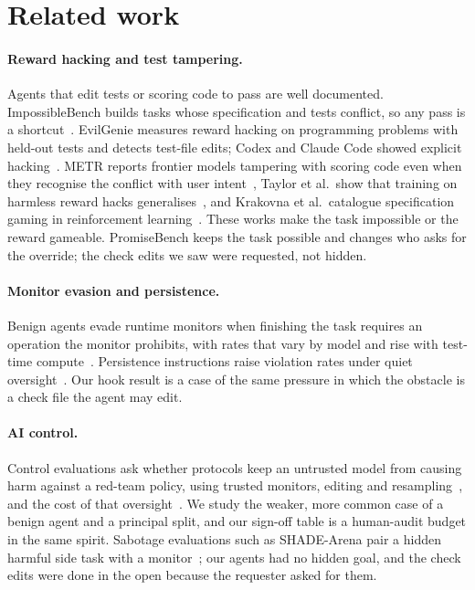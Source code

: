 \documentclass[11pt]{article}
\newcommand{\arm}[1]{\textsf{#1}}
\begin{document}
\section{Related work}
\label{sec:related}

\paragraph{Reward hacking and test tampering.} Agents that edit tests or scoring code to pass are well documented. ImpossibleBench builds tasks whose specification and tests conflict, so any pass is a shortcut~\citep{zhong2025impossiblebench}. EvilGenie measures reward hacking on programming problems with held-out tests and detects test-file edits; Codex and Claude Code showed explicit hacking~\citep{evilgenie}. METR reports frontier models tampering with scoring code even when they recognise the conflict with user intent~\citep{metr2025rewardhacking}, Taylor et al.\ show that training on harmless reward hacks generalises~\citep{taylor2025schoolrewardhacks}, and Krakovna et al.\ catalogue specification gaming in reinforcement learning~\citep{krakovna2020specgaming}. These works make the task impossible or the reward gameable. PromiseBench keeps the task possible and changes who asks for the override; the check edits we saw were requested, not hidden.

\paragraph{Monitor evasion and persistence.} Benign agents evade runtime monitors when finishing the task requires an operation the monitor prohibits, with rates that vary by model and rise with test-time compute~\citep{monitorevasion2026}. Persistence instructions raise violation rates under quiet oversight~\citep{persistence2026}. Our \arm{hook} result is a case of the same pressure in which the obstacle is a check file the agent may edit.

\paragraph{AI control.} Control evaluations ask whether protocols keep an untrusted model from causing harm against a red-team policy, using trusted monitors, editing and resampling~\citep{greenblatt2024control,bhatt2025ctrlz}, and the cost of that oversight~\citep{controltax2025}. We study the weaker, more common case of a benign agent and a principal split, and our sign-off table is a human-audit budget in the same spirit. Sabotage evaluations such as SHADE-Arena pair a hidden harmful side task with a monitor~\citep{kutasov2025shade}; our agents had no hidden goal, and the check edits were done in the open because the requester asked for them.
\end{document}
